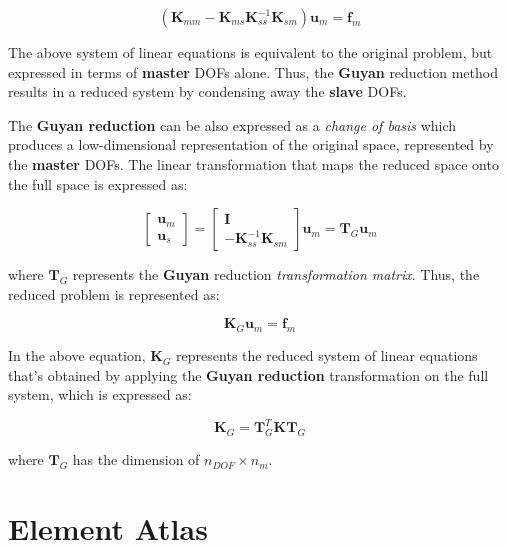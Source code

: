 \documentclass[10pt,b5paper,titlepage]{book}
\begin{document}
\begin{equation}
    \left(\mathbf{K}_{mm} - \mathbf{K}_{ms} \mathbf{K}_{ss}^{-1} \mathbf{K}_{sm} \right)
    \mathbf{u}_m = \mathbf{f}_m
\end{equation}

The above system of linear equations is equivalent to the original problem, but expressed
in terms of \textbf{master} DOFs alone. Thus, the \textbf{Guyan} reduction method
results in a reduced system by condensing away the \textbf{slave} DOFs.

The \textbf{Guyan reduction} can be also expressed as a \textit{change of basis} which
produces a low-dimensional representation of the original space, represented by the
\textbf{master} DOFs. The linear transformation that maps the reduced space onto
the full space is expressed as:

\begin{equation}
    \begin{bmatrix}
        \mathbf{u}_m \\
        \mathbf{u}_s
    \end{bmatrix} =
    \begin{bmatrix}
        \mathbf{I} \\
        -\mathbf{K}_{ss}^{-1} \mathbf{K}_{sm}
    \end{bmatrix}
    \mathbf{u}_m = \mathbf{T}_G \mathbf{u}_m
\end{equation}

where $ \mathbf{T}_G $ represents the \textbf{Guyan} reduction \textit{transformation matrix}.
Thus, the reduced problem is represented as:

\begin{equation}
    \mathbf{K}_G \mathbf{u}_m = \mathbf{f}_m
\end{equation}

In the above equation, $ \mathbf{K}_G $ represents the reduced system of linear equations
that's obtained by applying the \textbf{Guyan reduction} transformation on the
full system, which is expressed as:

\begin{equation}
    \mathbf{K}_G = \mathbf{T}_G^T \mathbf{K} \mathbf{T}_G
\end{equation}

where $ \mathbf{T}_G $ has the dimension of $ n_{DOF} \times n_m $.




\newpage
\chapter{Element Atlas}
\end{document}
